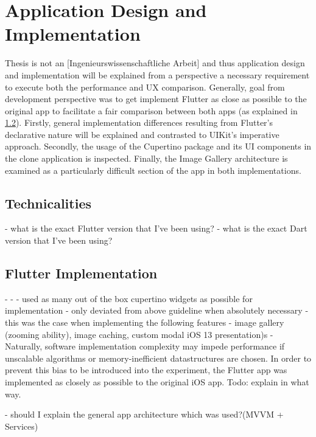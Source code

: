 \chapter{Application Design and Implementation} \label{chapter::implementation}
Thesis is not an [Ingenieurswissenschaftliche Arbeit] and thus application design and implementation will be explained from a perspective
a necessary requirement to execute both the performance and UX comparison.
Generally, goal from development perspective was to get implement Flutter as close as possible to the original app to facilitate a fair comparison between both apps (as explained in \ref{}).
Firstly, general implementation differences resulting from Flutter's declarative nature will be explained and contrasted to UIKit's imperative approach.
Secondly, the usage of the Cupertino package and its UI components in the clone application is inspected. 
Finally, the Image Gallery architecture is examined as a particularly difficult section of the app in both implementations.\\


\section{Technicalities}
- what is the exact Flutter version that I've been using?
- what is the exact Dart version that I've been using?




\section{Flutter Implementation}

- 
- 
- used as many out of the box cupertino widgets as possible for implementation
- only deviated from above guideline when absolutely necessary
- this was the case when implementing the following features
- image gallery (zooming ability), image caching, custom modal iOS 13 presentation)s
- Naturally, software implementation complexity may impede performance if unscalable algorithms or memory-inefficient datastructures are chosen.
In order to prevent this bias to be introduced into the experiment, the Flutter app was implemented as closely as possible to the original iOS app. Todo: explain in what way.

- should I explain the general app architecture which was used?(MVVM + Services)

